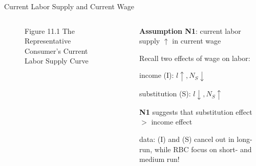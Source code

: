 \documentclass[11pt,aspectratio=169,usenames,dvipsnames]{beamer}
\let\tempone\itemize
\let\temptwo\enditemize
\renewenvironment{itemize}{\tempone\addtolength{\itemsep}{\fill}}{\temptwo}
\begin{document}
\begin{frame}{Current Labor Supply and Current Wage}
\label{slide:Current_Labor_Supply_and_Current_Wage}
    \begin{columns}
        \begin{column}{0.5\textwidth}
            \begin{figure}
                \caption{\scriptsize Figure 11.1  The Representative Consumer’s Current Labor Supply Curve}
            \end{figure}
        \end{column}
        \begin{column}{0.5\textwidth}
            \textbf{Assumption N1}: current labor supply $ \uparrow  $ in current wage
            \begin{itemize}
                \item Recall two effects of wage on labor:
                \begin{itemize}
                    \item income (I): $ l\uparrow, N_{S}\downarrow   $
                    \item substitution (S): $ l\downarrow, N_{S}\uparrow   $
                \end{itemize}
                \item \textbf{N1} suggests that \alert{substitution effect $ > $ income effect}
                \item data: (I) and (S) cancel out in long-run, while RBC focus on \alert{short- and medium run}!
            \end{itemize}
        \end{column}
    \end{columns}
\end{frame}
\end{document}
